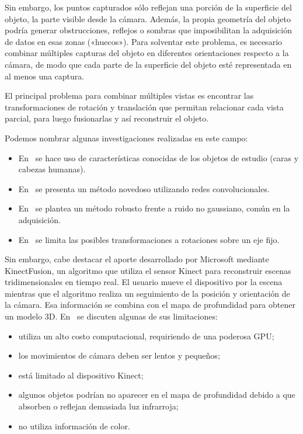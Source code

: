 	Sin embargo, los puntos capturados sólo reflejan una porción de la superficie del objeto,
	la parte visible desde la cámara.
	Además, la propia geometría del objeto podría generar obstrucciones, reflejos o sombras
	que imposibilitan la adquisición de datos en esas zonas («huecos»).
	Para solventar este problema, es necesario combinar múltiples capturas
	del objeto en diferentes orientaciones respecto a la cámara, de modo que
	cada parte de la superficie del objeto esté representada en al menos una captura.

	El principal problema para combinar múltiples vistas es
	encontrar las transformaciones de rotación y translación que permitan
	relacionar cada vista parcial, para luego fusionarlas y así reconstruir el objeto.

	Podemos nombrar algunas investigaciones realizadas en este campo:
	\begin{itemize}
		\item En~\cite{Hassanpour} %
	se hace uso de características conocidas de los objetos de estudio (caras y cabezas humanas).
		\item En~\cite{Riegler2017THREEDV} %
	se presenta un método novedoso utilizando redes convolucionales.
		\item En~\cite{Zach08fastand} %
	se plantea un método robusto frente a ruido no gaussiano, común en la adquisición.
		\item En~\cite{automatic-3d-model-construction-for-turn-table-sequences} %
	se limita las posibles transformaciones a rotaciones sobre un eje fijo.
	\end{itemize}

	Sin embargo, cabe destacar el aporte desarrollado por Microsoft mediante
	KinectFusion, un algoritmo que utiliza el sensor Kinect para reconstruir escenas tridimensionales en tiempo real.
	El usuario mueve el dispositivo por la escena mientras que el algoritmo realiza un seguimiento de la posición y orientación de la cámara. Esa información se combina con el mapa de profundidad para obtener un modelo 3D.
	En~\cite{real-time-3d-reconstruction-using-a-kinect-sensor} %
	se discuten algunas de sus limitaciones:
	\begin{itemize}
		\item utiliza un alto costo computacional, requiriendo de una poderosa GPU;
		\item los movimientos de cámara deben ser lentos y pequeños;
		\item está limitado al dispositivo Kinect;
		\item algunos objetos podrían no aparecer en el mapa de profundidad debido a que absorben o reflejan demasiada luz infrarroja;
		\item no utiliza información de color.
	\end{itemize}

